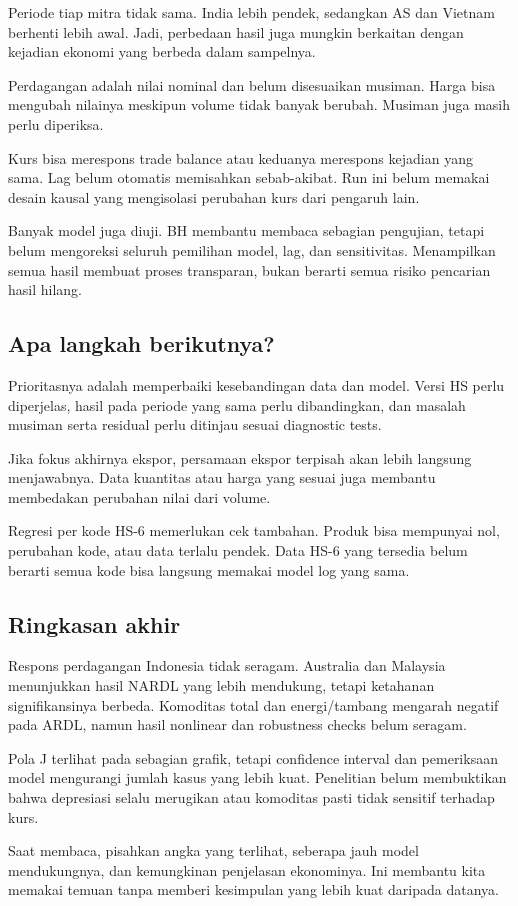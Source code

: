 Periode tiap mitra tidak sama. India lebih pendek, sedangkan AS dan Vietnam berhenti lebih awal. Jadi, perbedaan hasil juga mungkin berkaitan dengan kejadian ekonomi yang berbeda dalam sampelnya.

Perdagangan adalah nilai nominal dan belum disesuaikan musiman. Harga bisa mengubah nilainya meskipun volume tidak banyak berubah. Musiman juga masih perlu diperiksa.

Kurs bisa merespons trade balance atau keduanya merespons kejadian yang sama. Lag belum otomatis memisahkan sebab-akibat. Run ini belum memakai desain kausal yang mengisolasi perubahan kurs dari pengaruh lain.

Banyak model juga diuji. BH membantu membaca sebagian pengujian, tetapi belum mengoreksi seluruh pemilihan model, lag, dan sensitivitas. Menampilkan semua hasil membuat proses transparan, bukan berarti semua risiko pencarian hasil hilang.

\subsection{Apa langkah berikutnya?}
Prioritasnya adalah memperbaiki kesebandingan data dan model. Versi HS perlu diperjelas, hasil pada periode yang sama perlu dibandingkan, dan masalah musiman serta residual perlu ditinjau sesuai diagnostic tests.

Jika fokus akhirnya ekspor, persamaan ekspor terpisah akan lebih langsung menjawabnya. Data kuantitas atau harga yang sesuai juga membantu membedakan perubahan nilai dari volume.

Regresi per kode HS-6 memerlukan cek tambahan. Produk bisa mempunyai nol, perubahan kode, atau data terlalu pendek. Data HS-6 yang tersedia belum berarti semua kode bisa langsung memakai model log yang sama.

\subsection{Ringkasan akhir}
Respons perdagangan Indonesia tidak seragam. Australia dan Malaysia menunjukkan hasil NARDL yang lebih mendukung, tetapi ketahanan signifikansinya berbeda. Komoditas total dan energi/tambang mengarah negatif pada ARDL, namun hasil nonlinear dan robustness checks belum seragam.

Pola J terlihat pada sebagian grafik, tetapi confidence interval dan pemeriksaan model mengurangi jumlah kasus yang lebih kuat. Penelitian belum membuktikan bahwa depresiasi selalu merugikan atau komoditas pasti tidak sensitif terhadap kurs.

Saat membaca, pisahkan angka yang terlihat, seberapa jauh model mendukungnya, dan kemungkinan penjelasan ekonominya. Ini membantu kita memakai temuan tanpa memberi kesimpulan yang lebih kuat daripada datanya.
